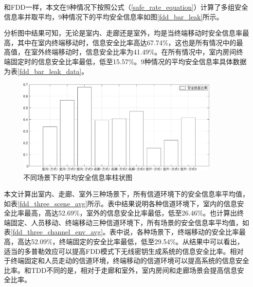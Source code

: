 \documentclass[master]{seuthesis} %
\begin{document}
\begin{Main}
和FDD一样，本文在9种情况下按照公式（\ref{safe_rate_equation}）计算了多组安全信息率并取平均，9种情况下的平均安全信息率如图\ref{fdd_bar_leak}所示。

分析图中结果可知，无论是室内、走廊还是室外，均是当终端移动时安全信息率最高，其中在室内终端移动时，信息安全比率高达67.74\%，这也是所有情况中的最高值，在室外终端移动时，信息安全比率为41.49\%。在所有情况中，室内房间终端固定时的信息安全比率最低，低至15.57\%。9种情况的平均安全信息率具体数据为表\ref{fdd_bar_leak_data}。


\begin{figure}[htbp!]
    \centering \includegraphics[width=0.9\textwidth]{images/fdd-leak/bar.eps}
    \caption{不同场景下的平均安全信息率柱状图}
    \label{tdd_bar_leak}
\end{figure}

\begin{table}[htbp] %
    \centering
    \caption{不同场景下的平均安全信息率数值
    \label{fdd_bar_leak_data}}
\end{table}


本文计算出室内、走廊、室外三种场景下，所有信道环境下的安全信息率平均值，如表\ref{fdd_three_scene_avg}所示。表中结果说明各种信道环境下，室内的信息安全比率最高，高达52.69\%，室外的信息安全比率最低，低至26.46\%。也计算出终端固定、人员移动、终端移动三种信道环境下，所有场景的安全信息率平均值，如表\ref{fdd_three_channel_env_avg}。表中说，各种场景下，终端移动的安全比率最高，高达52.09\%，终端固定的安全比率最低，低至29.54\%。从结果中可以看出，适当的多普勒效应可以提高FDD模式下无线密钥生成系统的信息安全比率。相对于终端固定和人员走动的信道环境，终端移动的信道环境可以提高系统的信息安全比率。和TDD不同的是，相对于走廊和室外，室内房间和走廊场景会提高信息安全比率。


\end{Main}
\end{document}
